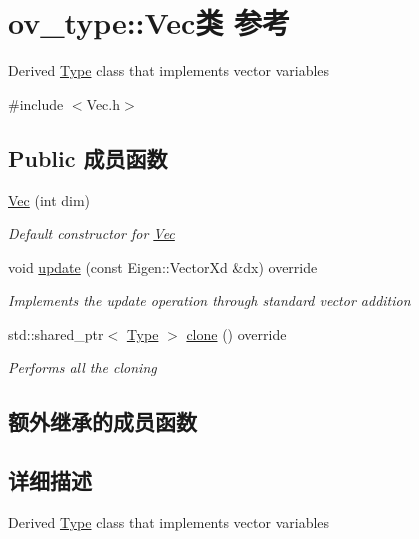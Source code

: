 \hypertarget{classov__type_1_1Vec}{}\section{ov\+\_\+type\+:\+:Vec类 参考}
\label{classov__type_1_1Vec}


Derived \hyperlink{classov__type_1_1Type}{Type} class that implements vector variables  




{\ttfamily \#include $<$Vec.\+h$>$}

\subsection*{Public 成员函数}
\begin{DoxyCompactItemize}
\item 
\hyperlink{classov__type_1_1Vec_aae80ad8a2e9580f20ee90e126f36bcb0}{Vec} (int dim)
\begin{DoxyCompactList}\small\item\em Default constructor for \hyperlink{classov__type_1_1Vec}{Vec} \end{DoxyCompactList}\item 
void \hyperlink{classov__type_1_1Vec_a7d66e9414946807c9469de0a1038256d}{update} (const Eigen\+::\+Vector\+Xd \&dx) override
\begin{DoxyCompactList}\small\item\em Implements the update operation through standard vector addition \end{DoxyCompactList}\item 
\mbox{\label{classov__type_1_1Vec_a31a73978bc3c8dc0f0df1a1abc83664f}} 
std\+::shared\+\_\+ptr$<$ \hyperlink{classov__type_1_1Type}{Type} $>$ \hyperlink{classov__type_1_1Vec_a31a73978bc3c8dc0f0df1a1abc83664f}{clone} () override
\begin{DoxyCompactList}\small\item\em Performs all the cloning \end{DoxyCompactList}\end{DoxyCompactItemize}
\subsection*{额外继承的成员函数}


\subsection{详细描述}
Derived \hyperlink{classov__type_1_1Type}{Type} class that implements vector variables 

